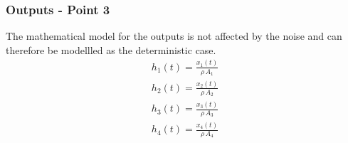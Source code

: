 \subsubsection{Outputs - Point 3}
The mathematical model for the outputs is not affected by the noise and can therefore be modellled as the deterministic case.
\begin{equation}
    \begin{gathered}
        h_1(t)=\frac{x_1(t)}{\rho\,A_1}\\
        h_2(t)=\frac{x_2(t)}{\rho\,A_2}\\
        h_3(t)=\frac{x_3(t)}{\rho\,A_3}\\
        h_4(t)=\frac{x_4(t)}{\rho\,A_4}
    \end{gathered}
\end{equation}